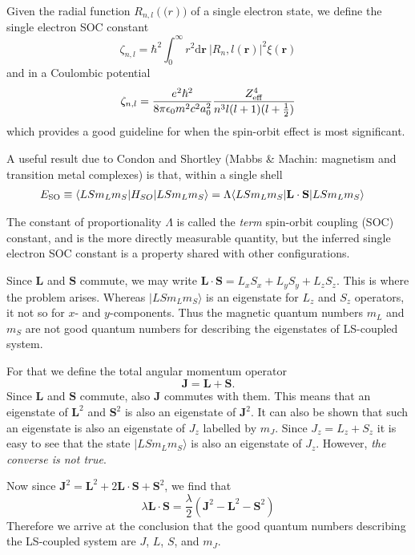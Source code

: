 Given the radial function $R_{n,l}(\mathbf(r))$ of a single electron state, we define the single electron SOC constant 
\begin{equation}
\zeta_{n,l} = \hbar^2\int_0^\infty r^2\mathrm{d}\mathbf{r}~|R_n,l(\mathbf{r})|^2\xi(\mathbf{r})
\end{equation}
and in a Coulombic potential
\begin{equation}
\zeta_{n,l}  = \frac{e^2\hbar^2}{8\pi\epsilon_0m^2c^2a_0^2}\frac{Z_{\rm eff}^4}{n^3l(l+1)(l+\frac{1}{2})}
\end{equation}
which provides a good guideline for when the spin-orbit effect is most significant.

A useful result due to Condon and Shortley (Mabbs \& Machin: magnetism and transition metal complexes) is that, within a single shell 
\begin{align}
E_{\rm SO}  &\equiv \langle LSm_Lm_S|H_{SO}|LSm_Lm_S\rangle = \Lambda \langle LSm_Lm_S|\mathbf{L}\cdot\mathbf{S}|LSm_Lm_S\rangle
\end{align}

The constant of proportionality $\Lambda$ is called the \textit{term} spin-orbit coupling (SOC) constant, and is the more directly measurable quantity, but the inferred single electron SOC constant is a property shared with other configurations.

Since $\mathbf{L}$ and $\mathbf{S}$ commute, we may write $\mathbf{L} \cdot \mathbf{S} = L_x S_x + L_y S_y + L_z S_z$. This is where the problem arises. Whereas $|LSm_Lm_S\rangle$ is an eigenstate for $L_z$ and $S_z$ operators, it not so for $x$- and $y$-components. Thus the magnetic quantum numbers $m_L$ and $m_S$ are not good quantum numbers for describing the eigenstates of LS-coupled system.

For that we define the total angular momentum operator 
\begin{equation}
\mathbf{J} = \mathbf{L} + \mathbf{S}.
\end{equation}
Since $\mathbf{L}$ and  $\mathbf{S}$ commute, also $\mathbf{J}$ commutes with them. This means that an eigenstate of $\mathbf{L}^2$ and $\mathbf{S}^2$ is also an eigenstate of $\mathbf{J}^2$. It can also be shown that such an eigenstate is also an eigenstate of $J_z$ labelled by $m_J$. Since $J_z = L_z + S_z$ it is easy to see that the state $|LSm_Lm_S\rangle$ is also an eigenstate of $J_z$. However, \emph{the converse is not true}.

Now since $\mathbf{J}^2 = \mathbf{L}^2 + 2\mathbf{L} \cdot \mathbf{S} + \mathbf{S}^2$, we find that
\begin{equation}
\lambda \mathbf{L} \cdot \mathbf{S} = \frac{\lambda}{2}(\mathbf{J}^2-\mathbf{L}^2-\mathbf{S}^2 )
\end{equation}
Therefore we arrive at the conclusion that the good quantum numbers describing the LS-coupled system are $J$, $L$, $S$, and $m_J$.




 
\nocite{ashcroftmermin,blundell_book}


